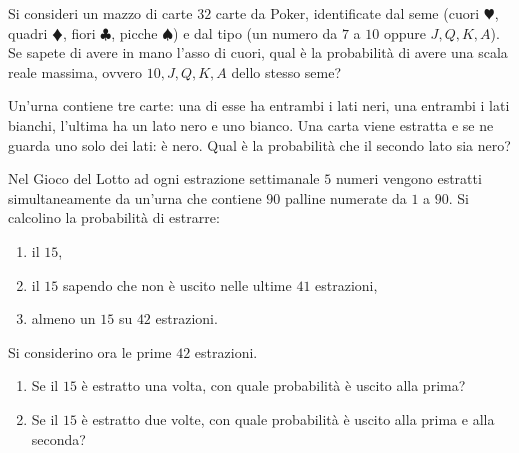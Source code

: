 \Esercizio{}

Si consideri un mazzo di carte $32$ carte da Poker, identificate dal seme (cuori $\varheartsuit $, quadri $\vardiamondsuit $, fiori $\clubsuit $, picche $\spadesuit $) e dal tipo (un numero da $7$ a $10$ oppure $J,Q,K,A$). Se sapete di avere in mano l'asso di cuori, qual è la probabilità di avere una scala reale massima, ovvero $10,J,Q,K,A$ dello stesso seme?

\Esercizio{}

Un'urna contiene tre carte: una di esse ha entrambi i lati neri, una entrambi i lati bianchi, l'ultima ha un lato nero e uno bianco. Una carta viene estratta e se ne guarda uno solo dei lati: è nero. Qual è la probabilità che il secondo lato sia nero?

\Esercizio{}

Nel Gioco del Lotto ad ogni estrazione settimanale $5$ numeri vengono estratti simultaneamente da un'urna che contiene $90$ palline numerate da $1$ a $90$. Si calcolino la probabilità di estrarre:
\begin{enumerate}
	\item il $15$,
	\item il $15$ sapendo che non è uscito nelle ultime $41$ estrazioni,
	\item almeno un $15$ su $42$ estrazioni.
\end{enumerate}

Si considerino ora le prime $42$ estrazioni.
\begin{enumerate}
	\item Se il $15$ è estratto una volta, con quale probabilità è uscito alla prima?
	\item Se il $15$ è estratto due volte, con quale probabilità è uscito alla prima e alla seconda?
\end{enumerate}


